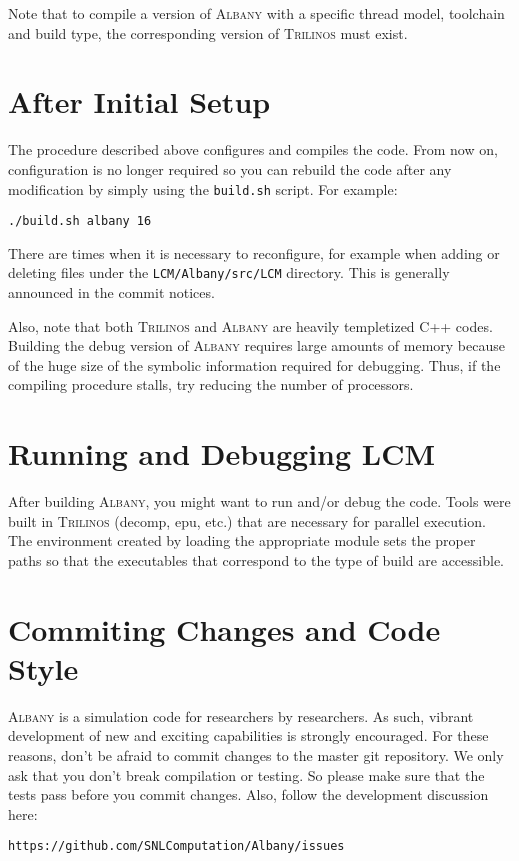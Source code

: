 \documentclass{article}
\newcommand{\trilinos}{\textsc{Trilinos}}
\newcommand{\albany}{\textsc{Albany}}
\newcommand{\lcm}{\textsc{LCM}}
\begin{document}
Note that to compile a version of \albany{} with a specific thread model,
toolchain and build type, the corresponding version of \trilinos{} must
exist.

\section{After Initial Setup}
The procedure described above configures and compiles the code. From
now on, configuration is no longer required so you can rebuild the
code after any modification by simply using the \verb+build.sh+
script. For example:
\begin{verbatim}
./build.sh albany 16
\end{verbatim}
There are times when it is necessary to reconfigure, for example when
adding or deleting files under the \verb+LCM/Albany/src/LCM+
directory. This is generally announced in the commit notices.

Also, note that both \trilinos{} and \albany{} are heavily templetized
C++ codes. Building the debug version of \albany{} requires large
amounts of memory because of the huge size of the symbolic information
required for debugging. Thus, if the compiling procedure stalls, try
reducing the number of processors.

\section{Running and Debugging \lcm{}} 

After building \albany{}, you might want to run and/or debug the code.
Tools were built in \trilinos{} (decomp, epu, etc.) that are necessary
for parallel execution. The environment created by loading the
appropriate module sets the proper paths so that the executables that
correspond to the type of build are accessible.

\section{Commiting Changes and Code Style}
\albany{} is a simulation code for researchers by researchers. As
such, vibrant development of new and exciting capabilities is strongly
encouraged. For these reasons, don't be afraid to commit changes to
the master git repository. We only ask that you don't break
compilation or testing. So please make sure that the tests pass before
you commit changes. Also, follow the development discussion here:
\begin{verbatim}
https://github.com/SNLComputation/Albany/issues
\end{verbatim}
\end{document}
